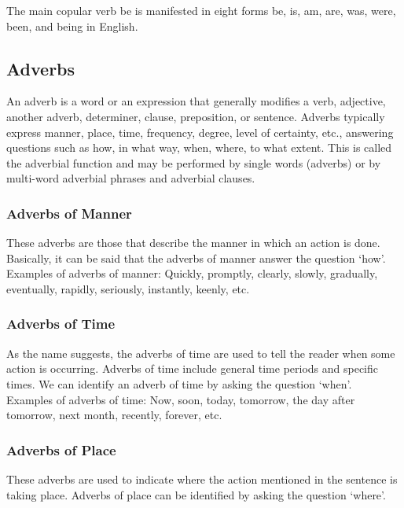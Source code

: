 The main copular verb be is manifested in eight forms be, is, am, are, was, were, been, and being in English.












\subsection{Adverbs \cite{wiki-adverb}}
An adverb is a word or an expression that generally modifies a verb, adjective, another adverb, determiner, clause, preposition, or sentence. Adverbs typically express manner, place, time, frequency, degree, level of certainty, etc., answering questions such as how, in what way, when, where, to what extent. This is called the adverbial function and may be performed by single words (adverbs) or by multi-word adverbial phrases and adverbial clauses.

\subsubsection{Adverbs of Manner \cite{byjus-english-types-of-adverbs}}
These adverbs are those that describe the manner in which an action is done. Basically, it can be said that the adverbs of manner answer the question ‘how’. \\

Examples of adverbs of manner: Quickly, promptly, clearly, slowly, gradually, eventually, rapidly, seriously, instantly, keenly, etc.

\subsubsection{Adverbs of Time \cite{byjus-english-types-of-adverbs}}
As the name suggests, the adverbs of time are used to tell the reader when some action is occurring. Adverbs of time include general time periods and specific times. We can identify an adverb of time by asking the question ‘when’.\\

Examples of adverbs of time: Now, soon, today, tomorrow, the day after tomorrow, next month, recently, forever, etc.

\subsubsection{Adverbs of Place \cite{byjus-english-types-of-adverbs}}
These adverbs are used to indicate where the action mentioned in the sentence is taking place. Adverbs of place can be identified by asking the question ‘where’. \\

